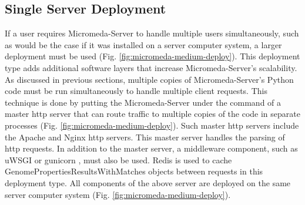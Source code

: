 \subsection{Single Server Deployment} \label{single-server-micromeda-deployment}

If a user requires Micromeda-Server to handle multiple users simultaneously, 
such as would be the case if it was installed on a server computer system, a 
larger deployment must be used (Fig. \ref{fig:micromeda-medium-deploy}). This 
deployment type adds additional software layers that increase Micromeda-Server's 
scalability. As discussed in previous sections, multiple copies of 
Micromeda-Server's Python code must be run simultaneously to handle multiple 
client requests. This technique is done by putting the Micromeda-Server under 
the command of a master \gls{http} server that can route traffic to multiple 
copies of the code in separate processes (Fig. 
\ref{fig:micromeda-medium-deploy}). Such master \gls{http} servers include the 
Apache \cite{fielding1997apache} and Nginx \cite{reese2008nginx} \gls{http} 
servers. This master server handles the parsing of \gls{http} requests. In 
addition to the master server, a middleware component, such as uWSGI 
\cite{2019uwsgi} or gunicorn \cite{chesneau_2018}, must also be used. Redis is 
used to cache GenomePropertiesResultsWithMatches objects between requests in 
this deployment type. All components of the above server are deployed on the 
same server computer system (Fig. \ref{fig:micromeda-medium-deploy}).

